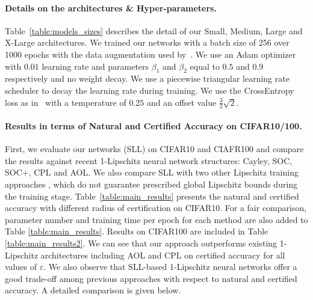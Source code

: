 \documentclass{article} \usepackage{iclr2023_conference,times}
\newcommand{\0}{\mathbf{0} }
\begin{document}
\paragraph{Details on the architectures \& Hyper-parameters.}
Table~\ref{table:models_sizes} describes the detail of our Small, Medium, Large and X-Large architectures.
We trained our networks with a batch size of 256 over 1000 epochs with the data augmentation used by~.
We use an Adam optimizer~\citep{diederik2014adam} with $0.01$ learning rate and parameters $\beta_1$ and $\beta_2$ equal to $0.5$ and $0.9$ respectively and no weight decay.
We use a piecewise triangular learning rate scheduler to decay the learning rate during training.
We use the CrossEntropy loss as in~\cite{prach2022almost} with a temperature of $0.25$ and an offset value $\frac32 \sqrt{2}$.


\vspace{-0.2cm}
\paragraph{Results in terms of  Natural and Certified Accuracy on CIFAR10/100.}
First, we evaluate our networks (SLL) on CIFAR10 and CIAFR100 and compare the results against recent 1-Lipschitz neural network structures: Cayley, SOC, SOC+, CPL and AOL.
We also compare SLL with two other Lipschitz training approaches \citep{leino2021globally,huang2021training},  which do not guarantee prescribed global Lipschitz bounds during the training stage.
Table~\ref{table:main_results} presents the natural and certified accuracy with different radius of certification on CIFAR10. 
For a fair comparison, parameter number and training time per epoch for each method are also added to Table \ref{table:main_results}. Results on CIFAR100 are included in Table \ref{table:main_results2}.
We can see that our approach outperforms existing 1-Lipschitz architectures including AOL and CPL on certified accuracy for all values of $\varepsilon$.
We also observe that SLL-based 1-Lipschitz neural networks offer a good trade-off among previous approaches with respect to natural and certified accuracy. A detailed comparison is given below.

\vspace{-0.2cm}
\end{document}
